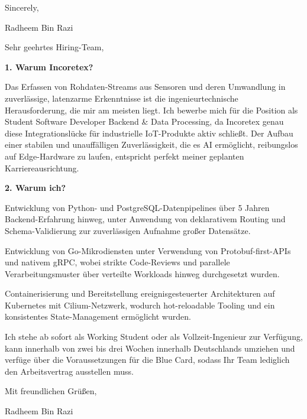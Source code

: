 \documentclass[11pt,a4paper]{coverletter}
\begin{document}
\closing{Sincerely,}{Radheem Bin Razi}

\clearpage
{}


\opening{Sehr geehrtes Hiring-Team,}

\vspace{8pt}\noindent\textbf{1. Warum Incoretex?}\par\vspace{3pt}

Das Erfassen von Rohdaten-Streams aus Sensoren und deren Umwandlung in zuverlässige, latenzarme Erkenntnisse ist die ingenieurtechnische Herausforderung, die mir am meisten liegt. Ich bewerbe mich für die Position als Student Software Developer Backend \& Data Processing, da Incoretex genau diese Integrationslücke für industrielle IoT-Produkte aktiv schließt. Der Aufbau einer stabilen und unauffälligen Zuverlässigkeit, die es AI ermöglicht, reibungslos auf Edge-Hardware zu laufen, entspricht perfekt meiner geplanten Karriereausrichtung.

\vspace{8pt}\noindent\textbf{2. Warum ich?}\par\vspace{3pt}

\bullets

  \item Entwicklung von Python- und PostgreSQL-Datenpipelines über 5 Jahren Backend-Erfahrung hinweg, unter Anwendung von deklarativem Routing und Schema-Validierung zur zuverlässigen Aufnahme großer Datensätze.

  \item Entwicklung von Go-Mikrodiensten unter Verwendung von Protobuf-first-APIs und nativem gRPC, wobei strikte Code-Reviews und parallele Verarbeitungsmuster über verteilte Workloads hinweg durchgesetzt wurden.

  \item Containerisierung und Bereitstellung ereignisgesteuerter Architekturen auf Kubernetes mit Cilium-Netzwerk, wodurch hot-reloadable Tooling und ein konsistentes State-Management ermöglicht wurden.

\bulletsend

Ich stehe ab sofort als Working Student oder als Vollzeit-Ingenieur zur Verfügung, kann innerhalb von zwei bis drei Wochen innerhalb Deutschlands umziehen und verfüge über die Voraussetzungen für die Blue Card, sodass Ihr Team lediglich den Arbeitsvertrag ausstellen muss.

\closing{Mit freundlichen Grüßen,}{Radheem Bin Razi}
\end{document}

